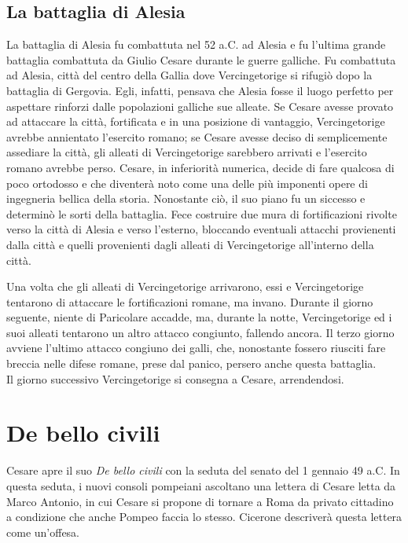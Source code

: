 \documentclass[10pt,a4paper]{article}
\begin{document}
\subsection{La battaglia di Alesia}

La battaglia di Alesia fu combattuta nel 52 a.C. ad Alesia e fu l'ultima grande battaglia combattuta da Giulio Cesare durante le guerre galliche. Fu combattuta ad Alesia, città del centro della Gallia dove Vercingetorige si rifugiò dopo la battaglia di Gergovia. Egli, infatti, pensava che Alesia fosse il luogo perfetto per aspettare rinforzi dalle popolazioni galliche sue alleate. Se Cesare avesse provato ad attaccare la città, fortificata e in una posizione di vantaggio, Vercingetorige avrebbe annientato l'esercito romano; se Cesare avesse deciso di semplicemente assediare la città, gli alleati di Vercingetorige sarebbero arrivati e l'esercito romano avrebbe perso. Cesare, in inferiorità numerica, decide di fare qualcosa di poco ortodosso e che diventerà noto come una delle più imponenti opere di ingegneria bellica della storia. Nonostante ciò, il suo piano fu un siccesso e determinò le sorti della battaglia. Fece costruire due mura di fortificazioni rivolte verso la città di Alesia e verso l'esterno, bloccando eventuali attacchi provienenti dalla città e quelli provenienti dagli alleati di Vercingetorige all'interno della città.

Una volta che gli alleati di Vercingetorige arrivarono, essi e Vercingetorige tentarono di attaccare le fortificazioni romane, ma invano. Durante il giorno seguente, niente di Paricolare accadde, ma, durante la notte, Vercingetorige ed i suoi alleati tentarono un altro attacco congiunto, fallendo ancora. Il terzo giorno avviene l'ultimo attacco congiuno dei galli, che, nonostante fossero riusciti fare breccia nelle difese romane, prese dal panico, persero anche questa battaglia.\\

Il giorno successivo Vercingetorige si consegna a Cesare, arrendendosi.

\section{De bello civili}

Cesare apre il suo \textit{De bello civili} con la seduta del senato del 1 gennaio 49 a.C. In questa seduta, i nuovi consoli pompeiani ascoltano una lettera di Cesare letta da Marco Antonio, in cui Cesare si propone di tornare a Roma da privato cittadino a condizione che anche Pompeo faccia lo stesso. Cicerone descriverà questa lettera come un'offesa.
\end{document}
